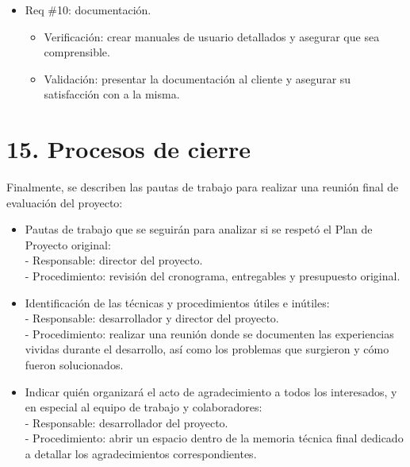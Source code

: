 \documentclass[
11pt, %
]{charter}
\begin{document}
\begin{itemize} 
\item Req \#10: documentación.
	\begin{itemize}
	\item Verificación: crear manuales de usuario detallados y asegurar que sea comprensible.
	\item Validación: presentar la documentación al cliente y asegurar su satisfacción con a la misma.
	\end{itemize}
\end{itemize}

\section{15. Procesos de cierre}    
\label{sec:cierre}

Finalmente, se describen las pautas de trabajo para realizar una reunión final de evaluación del proyecto:

\begin{itemize}
	\item Pautas de trabajo que se seguirán para analizar si se respetó el Plan de Proyecto original:\\
	 - Responsable: director del proyecto.\\
	 - Procedimiento: revisión del cronograma, entregables y presupuesto original.
	\item Identificación de las técnicas y procedimientos útiles e inútiles:\\
	 - Responsable: desarrollador y director del proyecto.\\
	 - Procedimiento: realizar una reunión donde se documenten las experiencias vividas durante el desarrollo, así como los problemas que surgieron y cómo fueron solucionados.
	\item Indicar quién organizará el acto de agradecimiento a todos los interesados, y en especial al equipo de trabajo y colaboradores:\\
	 - Responsable: desarrollador del proyecto.\\
	 - Procedimiento: abrir un espacio dentro de la memoria técnica final dedicado a detallar los agradecimientos correspondientes.
\end{itemize}
\end{document}
